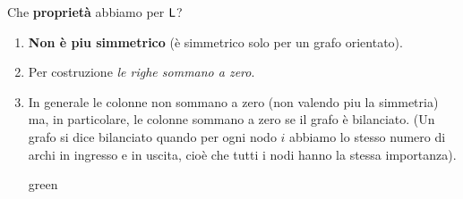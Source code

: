 Che \textbf{propriet\`a} abbiamo per $\mathsf{L}$?
\begin{enumerate}
\item \textbf{Non \`e piu simmetrico} (\`e simmetrico solo per un grafo orientato).
\item Per costruzione \textit{le righe sommano a zero}.
\item In generale le colonne non sommano a zero (non valendo piu la simmetria) ma, in particolare, le colonne sommano a zero se il grafo \`e bilanciato. (Un grafo si dice bilanciato quando per ogni nodo $i$ abbiamo lo stesso numero di archi in ingresso e in uscita, cio\`e che tutti i nodi hanno la stessa importanza).
\begin{mybox}{green}{}
\begin{center}
\end{center}
\end{mybox}
\end{enumerate}
